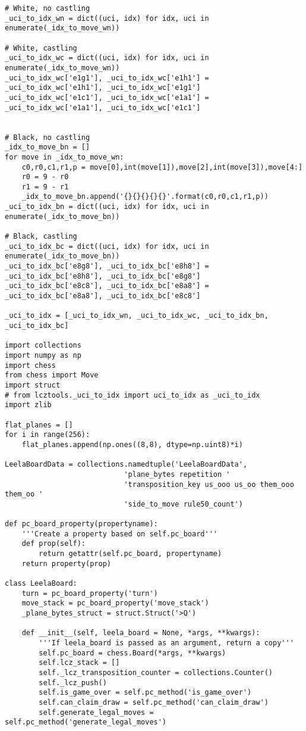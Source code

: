 \begin{verbatim}
# White, no castling
_uci_to_idx_wn = dict((uci, idx) for idx, uci in enumerate(_idx_to_move_wn))

# White, castling
_uci_to_idx_wc = dict((uci, idx) for idx, uci in enumerate(_idx_to_move_wn))
_uci_to_idx_wc['e1g1'], _uci_to_idx_wc['e1h1'] = _uci_to_idx_wc['e1h1'], _uci_to_idx_wc['e1g1']
_uci_to_idx_wc['e1c1'], _uci_to_idx_wc['e1a1'] = _uci_to_idx_wc['e1a1'], _uci_to_idx_wc['e1c1'] 


# Black, no castling
_idx_to_move_bn = []
for move in _idx_to_move_wn:
    c0,r0,c1,r1,p = move[0],int(move[1]),move[2],int(move[3]),move[4:]
    r0 = 9 - r0
    r1 = 9 - r1
    _idx_to_move_bn.append('{}{}{}{}{}'.format(c0,r0,c1,r1,p))
_uci_to_idx_bn = dict((uci, idx) for idx, uci in enumerate(_idx_to_move_bn))

# Black, castling
_uci_to_idx_bc = dict((uci, idx) for idx, uci in enumerate(_idx_to_move_bn))
_uci_to_idx_bc['e8g8'], _uci_to_idx_bc['e8h8'] = _uci_to_idx_bc['e8h8'], _uci_to_idx_bc['e8g8']
_uci_to_idx_bc['e8c8'], _uci_to_idx_bc['e8a8'] = _uci_to_idx_bc['e8a8'], _uci_to_idx_bc['e8c8'] 

_uci_to_idx = [_uci_to_idx_wn, _uci_to_idx_wc, _uci_to_idx_bn, _uci_to_idx_bc]

import collections
import numpy as np
import chess
from chess import Move
import struct
# from lcztools._uci_to_idx import uci_to_idx as _uci_to_idx
import zlib

flat_planes = []
for i in range(256):
    flat_planes.append(np.ones((8,8), dtype=np.uint8)*i)

LeelaBoardData = collections.namedtuple('LeelaBoardData',
                            'plane_bytes repetition '
                            'transposition_key us_ooo us_oo them_ooo them_oo '
                            'side_to_move rule50_count')

def pc_board_property(propertyname):
    '''Create a property based on self.pc_board'''
    def prop(self):
        return getattr(self.pc_board, propertyname)
    return property(prop)
    
class LeelaBoard:
    turn = pc_board_property('turn')
    move_stack = pc_board_property('move_stack')
    _plane_bytes_struct = struct.Struct('>Q')
    
    def __init__(self, leela_board = None, *args, **kwargs):
        '''If leela_board is passed as an argument, return a copy'''
        self.pc_board = chess.Board(*args, **kwargs)
        self.lcz_stack = []
        self._lcz_transposition_counter = collections.Counter()
        self._lcz_push()
        self.is_game_over = self.pc_method('is_game_over')
        self.can_claim_draw = self.pc_method('can_claim_draw')
        self.generate_legal_moves = self.pc_method('generate_legal_moves')
                

\end{verbatim}
